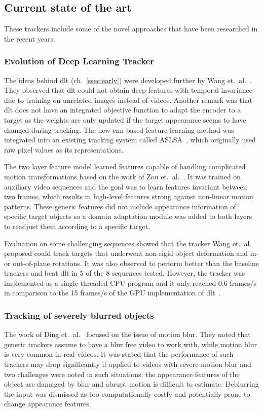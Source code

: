 \subsection{Current state of the art}
These trackers include some of the novel approaches that have been researched in the recent years.

\subsubsection{Evolution of Deep Learning Tracker}\label{sssec:learned_hierarch}
The ideas behind \ac{dlt} (ch.~\ref{ssec:early}) were developed further by Wang et.~al.~\cite{LEARNED_HIERARCH}. They observed that \ac{dlt} could not obtain deep features with temporal invariance due to training on unrelated images instead of videos. Another remark was that \ac{dlt} does not have an integrated objective function to adapt the encoder to a target as the weights are only updated if the target appearance seems to have changed during tracking. The new \ac{cnn} based feature learning method was integrated into an existing tracking system called ASLSA~\cite{ASLSA}, which originally used raw pixel values as its representations.~\cite{LEARNED_HIERARCH}

The two layer feature model learned features capable of handling complicated motion transformations based on the work of Zou et.~al.~\cite{INVARIANT_FEATS}. It was trained on auxiliary video sequences and the goal was to learn features invariant between two frames, which results in high-level features strong against non-linear motion patterns. These generic features did not include appearance information of specific target objects so a domain adaptation module was added to both layers to readjust them according to a specific target.~\cite{LEARNED_HIERARCH}

Evaluation on some challenging sequences showed that the tracker Wang et.~al.~\cite{LEARNED_HIERARCH} proposed could track targets that underwent non-rigid object deformation and in- or out-of-plane rotations. It was also observed to perform better than the baseline trackers and beat \ac{dlt} in 5 of the 8 sequences tested. However, the tracker was implemented as a single-threaded CPU program and it only reached 0.6 frames/s in comparison to the 15 frames/s of the GPU implementation of \ac{dlt}~\cite{DLT}.

\subsubsection{Tracking of severely blurred objects}\label{sssec:blur}
The work of Ding et.~al.~\cite{BLUR_TRACK} focused on the issue of motion blur. They noted that generic trackers assume to have a blur free video to work with, while motion blur is very common in real videos. It was stated that the performance of such trackers may drop significantly if applied to videos with severe motion blur and two challenges were noted in such situations: the appearance features of the object are damaged by blur and abrupt motion is difficult to estimate. Deblurring the input was dismissed as too computationally costly and potentially prone to change appearance features.~\cite{BLUR_TRACK}

